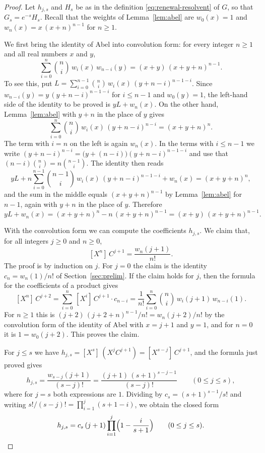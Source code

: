 \documentclass{amsart}
\theoremstyle{definition}
\theoremstyle{remark}
\numberwithin{equation}{section}
\begin{document}
\begin{proof}
Let $h_{j,s}$ and $H_s$ be as in the definition \eqref{eq:renewal-resolvent} of $G$, so that $G_s=e^{-s}H_s$. Recall that the weights of Lemma~\ref{lem:abel} are $w_0(x)=1$ and $w_n(x)=x\,(x+n)^{n-1}$ for $n\ge 1$.

We first bring the identity of Abel into convolution form: for every integer $n\ge 1$ and all real numbers $x$ and $y$,
\[
\sum_{i=0}^{n}\binom{n}{i}\,w_i(x)\,w_{n-i}(y)=(x+y)\,(x+y+n)^{n-1} .
\]
To see this, put $L=\sum_{i=0}^{n-1}\binom{n}{i}\,w_i(x)\,(y+n-i)^{n-1-i}$. Since $w_{n-i}(y)=y\,(y+n-i)^{n-1-i}$ for $i\le n-1$ and $w_0(y)=1$, the left-hand side of the identity to be proved is $yL+w_n(x)$. On the other hand, Lemma~\ref{lem:abel} with $y+n$ in the place of $y$ gives
\[
\sum_{i=0}^{n}\binom{n}{i}\,w_i(x)\,(y+n-i)^{n-i}=(x+y+n)^{n} .
\]
The term with $i=n$ on the left is again $w_n(x)$. In the terms with $i\le n-1$ we write $(y+n-i)^{n-i}=\bigl(y+(n-i)\bigr)(y+n-i)^{n-1-i}$ and use that $(n-i)\binom{n}{i}=n\binom{n-1}{i}$. The identity then reads
\[
yL+n\sum_{i=0}^{n-1}\binom{n-1}{i}\,w_i(x)\,(y+n-i)^{n-1-i}+w_n(x)=(x+y+n)^{n} ,
\]
and the sum in the middle equals $(x+y+n)^{n-1}$ by Lemma~\ref{lem:abel} for $n-1$, again with $y+n$ in the place of $y$. Therefore
\[
yL+w_n(x)=(x+y+n)^{n}-n\,(x+y+n)^{n-1}=(x+y)\,(x+y+n)^{n-1} .
\]

With the convolution form we can compute the coefficients $h_{j,s}$. We claim that, for all integers $j\ge 0$ and $n\ge 0$,
\[
[X^n]\,C^{j+1}=\frac{w_n(j+1)}{n!} .
\]
The proof is by induction on $j$. For $j=0$ the claim is the identity $c_n=w_n(1)/n!$ of Section~\ref{sec:prelim}. If the claim holds for $j$, then the formula for the coefficients of a product gives
\[
[X^n]\,C^{j+2}=\sum_{i=0}^{n}\,[X^i]\,C^{j+1}\cdot c_{n-i}=\frac{1}{n!}\sum_{i=0}^{n}\binom{n}{i}\,w_i(j+1)\,w_{n-i}(1) .
\]
For $n\ge 1$ this is $(j+2)\,(j+2+n)^{n-1}/n!=w_n(j+2)/n!$ by the convolution form of the identity of Abel with $x=j+1$ and $y=1$, and for $n=0$ it is $1=w_0(j+2)$. This proves the claim.

For $j\le s$ we have $h_{j,s}=[X^s]\,(X^jC^{j+1})=[X^{s-j}]\,C^{j+1}$, and the formula just proved gives
\[
h_{j,s}=\frac{w_{s-j}(j+1)}{(s-j)!}=\frac{(j+1)\,(s+1)^{s-j-1}}{(s-j)!}\qquad(0\le j\le s),
\]
where for $j=s$ both expressions are $1$. Dividing by $c_s=(s+1)^{s-1}/s!$ and writing $s!/(s-j)!=\prod_{i=1}^{j}(s+1-i)$, we obtain the closed form
\[
h_{j,s}=c_s\,(j+1)\prod_{i=1}^{j}\Bigl(1-\frac{i}{s+1}\Bigr)\qquad(0\le j\le s).
\]


\end{proof}
\end{document}
